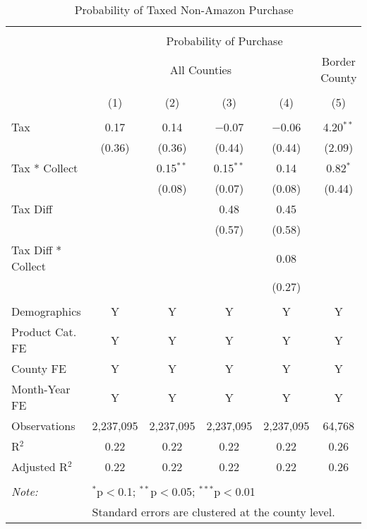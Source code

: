 
\begin{table}[!htbp] \centering 
  \caption{Probability of Taxed Non-Amazon Purchase} 
  \label{tab:taxed_nonamazonProb} 
\begin{tabular}{@{\extracolsep{5pt}}lccccc} 
\\[-1.8ex]\hline 
\hline \\[-1.8ex] 
 & \multicolumn{5}{c}{Probability of Purchase} \\ 
\cline{2-6} 
 & \multicolumn{4}{c}{All Counties} & Border County \\ 
\\[-1.8ex] & (1) & (2) & (3) & (4) & (5)\\ 
\hline \\[-1.8ex] 
 Tax & 0.17 & 0.14 & $-$0.07 & $-$0.06 & 4.20$^{**}$ \\ 
  & (0.36) & (0.36) & (0.44) & (0.44) & (2.09) \\ 
  Tax * Collect &  & 0.15$^{**}$ & 0.15$^{**}$ & 0.14 & 0.82$^{*}$ \\ 
  &  & (0.08) & (0.07) & (0.08) & (0.44) \\ 
  Tax Diff &  &  & 0.48 & 0.45 &  \\ 
  &  &  & (0.57) & (0.58) &  \\ 
  Tax Diff * Collect &  &  &  & 0.08 &  \\ 
  &  &  &  & (0.27) &  \\ 
 \hline \\[-1.8ex] 
Demographics & Y & Y & Y & Y & Y \\ 
Product Cat. FE & Y & Y & Y & Y & Y \\ 
County FE & Y & Y & Y & Y & Y \\ 
Month-Year FE & Y & Y & Y & Y & Y \\ 
Observations & 2,237,095 & 2,237,095 & 2,237,095 & 2,237,095 & 64,768 \\ 
R$^{2}$ & 0.22 & 0.22 & 0.22 & 0.22 & 0.26 \\ 
Adjusted R$^{2}$ & 0.22 & 0.22 & 0.22 & 0.22 & 0.26 \\ 
\hline 
\hline \\[-1.8ex] 
\textit{Note:}  & \multicolumn{5}{l}{$^{*}$p$<$0.1; $^{**}$p$<$0.05; $^{***}$p$<$0.01} \\ 
 & \multicolumn{5}{l}{Standard errors are clustered at the county level.} \\ 
\end{tabular} 
\end{table} 
